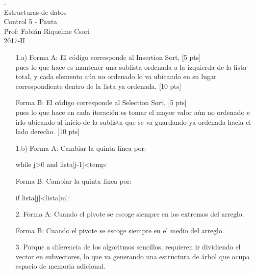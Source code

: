 \documentclass[letter,12pt,oneside]{book}
\theoremstyle{definition}
\begin{document}
\newpage

\begin{center}
 {\Large
  {\color{white}.}\\
  Estructuras de datos\\[1ex]
  Control 5 - Pauta}\\[1.2ex]
  Prof: Fabián Riquelme Csori\\
  2017-II
\end{center}

\begin{enumerate}
    \item[1.a)] Forma A: El código corresponde al Insertion Sort, \tabto{81ex} [5 pts]\\
    pues lo que hace es mantener una sublista ordenada a la izquierda de la lista total, y cada elemento aún no ordenado lo va ubicando en su lugar correspondiente dentro de la lista ya ordenada. \tabto{80ex} [10 pts]
    
    Forma B: El código corresponde al Selection Sort,\tabto{81ex} [5 pts]\\
    pues lo que hace en cada iteración es tomar el mayor valor aún no ordenado e irlo ubicando al inicio de la sublista que se va guardando ya ordenada hacia el lado derecho.\tabto{80ex} [10 pts]
    
    \item[1.b)] Forma A: Cambiar la quinta línea por:\\
    \begin{python}
        while j>0 and lista[j-1]<temp:
    \end{python}
    
    Forma B: Cambiar la quinta línea por:\\
    \begin{python}
        if lista[j]<lista[m]:
    \end{python}
    
    \item[2.] Forma A: Cuando el pivote se escoge siempre en los extremos del arreglo.
    
    Forma B: Cuando el pivote se escoge siempre en el medio del arreglo.
    
    \item[3.] Porque a diferencia de los algoritmos sencillos, requieren ir dividiendo el vector en subvectores, lo que va generando una estructura de árbol que ocupa espacio de memoria adicional.
\end{enumerate}
\end{document}
